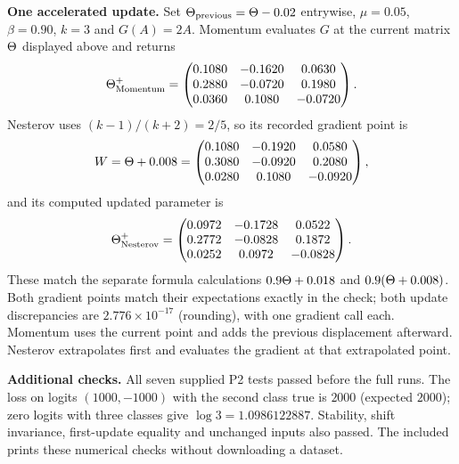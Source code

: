 \textbf{One accelerated update.} Set $\Theta_{\rm previous}=\Theta-0.02$ entrywise, $\mu=0.05$, $\beta=0.90$, $k=3$ and $G(A)=2A$. Momentum evaluates $G$ at the current matrix $\Theta$ displayed above and returns
\[\Theta^+_{\rm Momentum}=\begin{pmatrix}0.1080 & -0.1620 & 0.0630\\0.2880 & -0.0720 & 0.1980\\0.0360 & 0.1080 & -0.0720\end{pmatrix}.\]
Nesterov uses $(k-1)/(k+2)=2/5$, so its recorded gradient point is\[W=\Theta+0.008=\begin{pmatrix}0.1080 & -0.1920 & 0.0580\\0.3080 & -0.0920 & 0.2080\\0.0280 & 0.1080 & -0.0920\end{pmatrix},\]
and its computed updated parameter is\[\Theta^+_{\rm Nesterov}=\begin{pmatrix}0.0972 & -0.1728 & 0.0522\\0.2772 & -0.0828 & 0.1872\\0.0252 & 0.0972 & -0.0828\end{pmatrix}.\]
These match the separate formula calculations $0.9\Theta+0.018$ and $0.9(\Theta+0.008)$. Both gradient points match their expectations exactly in the check; both update discrepancies are $2.776\times10^{-17}$ (rounding), with one gradient call each. Momentum uses the current point and adds the previous displacement afterward. Nesterov extrapolates first and evaluates the gradient at that extrapolated point.

\textbf{Additional checks.} All seven supplied P2 tests passed before the full runs. The loss on logits $(1000,-1000)$ with the second class true is $2000$ (expected $2000$); zero logits with three classes give $\log3=1.0986122887$. Stability, shift invariance, first-update equality and unchanged inputs also passed. The included  prints these numerical checks without downloading a dataset.
